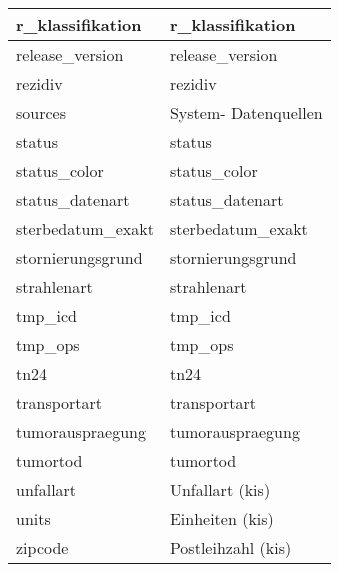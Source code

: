 \begin{longtable}{||p{5.3cm}|p{8.5cm}||}
  	r\_klassifikation & r\_klassifikation\\ \hline
  	release\_version & release\_version\\ \hline
  	rezidiv & rezidiv\\ \hline
  	sources & System- Datenquellen\\ \hline
  	status & status\\ \hline
  	status\_color & status\_color\\ \hline
  	status\_datenart & status\_datenart\\ \hline
  	sterbedatum\_exakt & sterbedatum\_exakt\\ \hline
  	stornierungsgrund & stornierungsgrund\\ \hline
  	strahlenart & strahlenart\\ \hline
  	tmp\_icd & tmp\_icd\\ \hline
  	tmp\_ops & tmp\_ops\\ \hline
  	tn24 & tn24\\ \hline
  	transportart & transportart\\ \hline
  	tumorauspraegung & tumorauspraegung\\ \hline
  	tumortod & tumortod\\ \hline
  	unfallart & Unfallart (\ac{kis})\\ \hline
  	units & Einheiten (\ac{kis})\\ \hline
  	zipcode & Postleihzahl (\ac{kis})\\ \hline  
  \end{longtable}